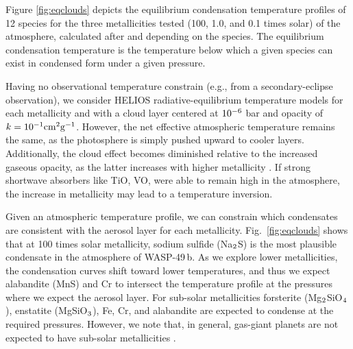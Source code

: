 \documentclass[tighten, times, twocolumn]{aastex61}  %
\newcommand\ttt[1]{10\sp{#1}}
\let\oldmsp=\sp
\let\oldmsb=\sb
\def\sp#1{\ifmmode
           \oldmsp{#1}%
         \else\strut\raise.85ex\hbox{\scriptsize #1}\fi}
\def\sb#1{\ifmmode
           \oldmsb{#1}%
         \else\strut\raise-.54ex\hbox{\scriptsize #1}\fi}
\begin{document}
Figure \ref{fig:eqclouds} depicts the equilibrium condensation
temperature profiles of 12 species for the three metallicities tested
(100, 1.0, and 0.1 times solar) of the atmosphere, calculated
after \citet{VisscherEtal2006apjAtmChemistryII,
VisscherEtal2010apjAtmChemistryIII}
and \citet{MorleyEtal2012apjTYdwarfClouds} depending on the species.
The equilibrium condensation temperature is the temperature below
which a given species can exist in condensed form under a given
pressure.

Having no observational temperature constrain (e.g., from a
secondary-eclipse observation), we consider HELIOS
radiative-equilibrium temperature models for each metallicity and with
a cloud layer centered at $\ttt{-6}$ bar and opacity of $k=\ttt{-1}
{\rm cm}\sp{2}{\rm g}\sp{-1}$.
  However,  the net
effective atmospheric temperature remains the same, as the photosphere
is simply pushed upward to cooler layers.  Additionally, the cloud
effect becomes diminished relative to the increased gaseous opacity,
as the latter increases with higher metallicity .  If strong shortwave absorbers like TiO,
VO,  were able to remain high in
the atmosphere, the increase in metallicity may lead to a temperature
inversion.

Given an atmospheric temperature profile, we can constrain which
condensates are consistent with the aerosol layer for each
metallicity.  Fig.~\ref{fig:eqclouds} shows that at 100 times solar
metallicity, sodium sulfide (Na$\sb2$S) is the most plausible
condensate in the atmosphere of WASP-49\,b.  As we explore lower
metallicities, the condensation curves shift toward lower
temperatures, and thus we expect alabandite (MnS) and Cr to intersect
the temperature profile at the pressures where we expect the aerosol
layer.  For sub-solar metallicities forsterite (Mg$\sb2$SiO$\sb4$),
enstatite (MgSiO$\sb3$), Fe, Cr, and alabandite are expected to
condense at the required pressures.  However, we note that, in
general, gas-giant planets are not expected to have sub-solar
metallicities \citep{KreidbergEtal2014apjWASP43b}.

\end{document}

